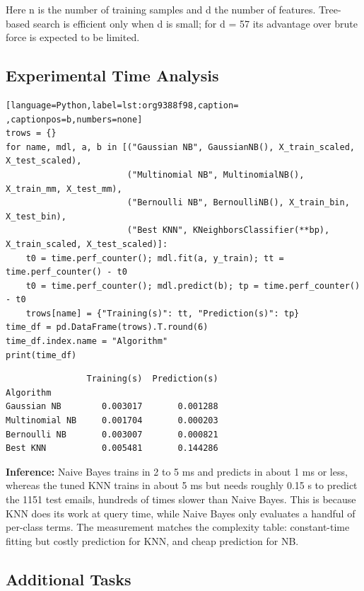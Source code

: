 \documentclass[11pt]{article}
\begin{document}
Here n is the number of training samples and d the number of features. Tree-based search is
efficient only when d is small; for d = 57 its advantage over brute force is expected to be
limited.

\subsection*{Experimental Time Analysis}
\label{sec:org1a6fd77}

\begin{lstlisting}[language=Python,label=lst:org9388f98,caption= ,captionpos=b,numbers=none]
trows = {}
for name, mdl, a, b in [("Gaussian NB", GaussianNB(), X_train_scaled, X_test_scaled),
                        ("Multinomial NB", MultinomialNB(), X_train_mm, X_test_mm),
                        ("Bernoulli NB", BernoulliNB(), X_train_bin, X_test_bin),
                        ("Best KNN", KNeighborsClassifier(**bp), X_train_scaled, X_test_scaled)]:
    t0 = time.perf_counter(); mdl.fit(a, y_train); tt = time.perf_counter() - t0
    t0 = time.perf_counter(); mdl.predict(b); tp = time.perf_counter() - t0
    trows[name] = {"Training(s)": tt, "Prediction(s)": tp}
time_df = pd.DataFrame(trows).T.round(6)
time_df.index.name = "Algorithm"
print(time_df)
\end{lstlisting}

\begin{verbatim}
                Training(s)  Prediction(s)
Algorithm                                 
Gaussian NB        0.003017       0.001288
Multinomial NB     0.001704       0.000203
Bernoulli NB       0.003007       0.000821
Best KNN           0.005481       0.144286
\end{verbatim}


\textbf{Inference:} Naive Bayes trains in 2 to 5 ms and predicts in about 1 ms or less, whereas the tuned KNN
trains in about 5 ms but needs roughly 0.15 s to predict the 1151 test emails, hundreds of
times slower than Naive Bayes. This is because KNN does its work at query time, while Naive
Bayes only evaluates a handful of per-class terms. The measurement matches the complexity
table: constant-time fitting but costly prediction for KNN, and cheap prediction for NB.

\subsection*{Additional Tasks}
\label{sec:org7836f91}
\end{document}
